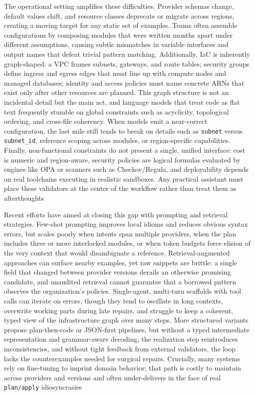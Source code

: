 \documentclass[acmsmall,screen,review,anonymous]{acmart}
\begin{document}
The operational setting amplifies these difficulties. Provider schemas change, default values shift, and resource classes deprecate or migrate across regions, creating a moving target for any static set of examples. Teams often assemble configurations by composing modules that were written months apart under different assumptions, causing subtle mismatches in variable interfaces and output names that defeat trivial pattern matching. Additionally, IaC is inherently graph-shaped: a VPC frames subnets, gateways, and route tables; security groups define ingress and egress edges that must line up with compute nodes and managed databases; identity and access policies must name concrete ARNs that exist only after other resources are planned. This graph structure is not an incidental detail but the main act, and language models that treat code as flat text frequently stumble on global constraints such as acyclicity, topological ordering, and cross-file coherency. When models emit a near-correct configuration, the last mile still tends to break on details such as \texttt{subnet} versus \texttt{subnet\_id}, reference scoping across modules, or region-specific capabilities. Finally, non-functional constraints do not present a single, unified interface: cost is numeric and region-aware, security policies are logical formulas evaluated by engines like OPA or scanners such as Checkov/Regula, and deployability depends on real toolchains executing in realistic sandboxes. Any practical assistant must place these validators at the center of the workflow rather than treat them as afterthoughts

Recent efforts have aimed at closing this gap with prompting and retrieval strategies. Few-shot prompting improves local idioms and reduces obvious syntax errors, but scales poorly when intents span multiple providers, when the plan includes three or more interlocked modules, or when token budgets force elision of the very context that would disambiguate a reference. Retrieval-augmented approaches can surface nearby examples, yet raw snippets are brittle: a single field that changed between provider versions derails an otherwise promising candidate, and unaudited retrieval cannot guarantee that a borrowed pattern observes the organization’s policies. Single-agent, multi-turn scaffolds with tool calls can iterate on errors, though they tend to oscillate in long contexts, overwrite working parts during late repairs, and struggle to keep a coherent, typed view of the infrastructure graph over many steps. More structured variants propose plan-then-code or JSON-first pipelines, but without a typed intermediate representation and grammar-aware decoding, the realization step reintroduces inconsistencies, and without tight feedback from external validators, the loop lacks the counterexamples needed for surgical repairs. Crucially, many systems rely on fine-tuning to imprint domain behavior; that path is costly to maintain across providers and versions and often under-delivers in the face of real \texttt{plan/apply} idiosyncrasies
\end{document}
